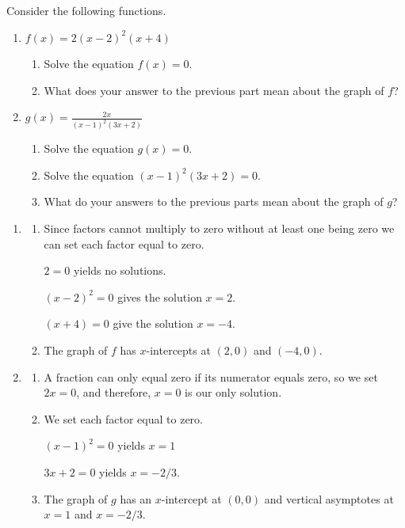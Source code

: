 \documentclass[noauthor,noinstructornotes]{ximera}
\begin{document}
\begin{problem}
Consider the following functions.

\begin{enumerate}
    \item \(f(x) = 2(x - 2)^2(x + 4)\)
    \begin{enumerate}
        \item Solve the equation \(f(x) = 0\).
        \item What does your answer to the previous part mean about the graph of \(f\)?
    \end{enumerate}
    \item \(g(x) = \frac{2x}{(x - 1)^2(3x + 2)}\)
    \begin{enumerate}
        \item Solve the equation \(g(x) = 0\).
        \item Solve the equation \((x - 1)^2(3x + 2) = 0\).
        \item What do your answers to the previous parts mean about the graph of \(g\)?
    \end{enumerate}
\end{enumerate}

\begin{explanation}
    \begin{enumerate}
        \item \begin{enumerate}
        \item Since factors cannot multiply to zero without at least one being zero
        we can set each factor equal to zero.

        \(2 = 0\) yields no solutions.

        \((x - 2)^2 = 0\) gives the solution \(x = 2\).

        \((x + 4) = 0\) give the solution \(x = -4\).

        \item The graph of \(f\) has \(x\)-intercepts at \((2, 0)\) and \((-4, 0)\).
        \end{enumerate}

        \item \begin{enumerate}
            \item A fraction can only equal zero if its numerator equals zero,
            so we set \(2x = 0\), and therefore, \(x = 0\) is our only solution.
            \item We set each factor equal to zero.
            
            \((x - 1)^2 = 0\) yields \(x = 1\)

            \(3x + 2 = 0\) yields \(x = -2/3\).

            \item The graph of \(g\) has an \(x\)-intercept at \((0, 0)\) and 
            vertical asymptotes at \(x = 1\) and \(x = -2/3\).
        \end{enumerate}
    \end{enumerate}
\end{explanation}
\end{problem}
\end{document}
